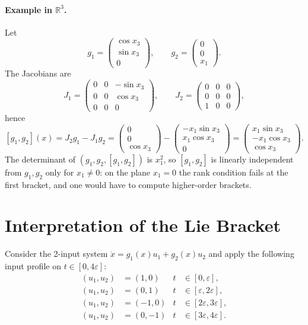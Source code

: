 \paragraph{Example in \( \mathbb{R}^3 \).}
Let
\[
g_1 = \begin{pmatrix} \cos x_3 \\ \sin x_3 \\ 0 \end{pmatrix},
\qquad
g_2 = \begin{pmatrix} 0 \\ 0 \\ x_1 \end{pmatrix}.
\]
The Jacobians are
\[
J_1 =
\begin{pmatrix}
    0 & 0 & -\sin x_3 \\
    0 & 0 & \cos x_3 \\
    0 & 0 & 0
\end{pmatrix},
\qquad
J_2 =
\begin{pmatrix}
    0 & 0 & 0 \\
    0 & 0 & 0 \\
    1 & 0 & 0
\end{pmatrix},
\]
hence
\[
[g_1, g_2](x) = J_2 g_1 - J_1 g_2 =
\begin{pmatrix} 0 \\ 0 \\ \cos x_3 \end{pmatrix}
- \begin{pmatrix} -x_1\sin x_3 \\ x_1\cos x_3 \\ 0 \end{pmatrix}
=
\begin{pmatrix}
    x_1 \sin x_3 \\
    -x_1 \cos x_3 \\
    \cos x_3
\end{pmatrix}.
\]
The determinant of \( (g_1, g_2, [g_1,g_2]) \) is \( x_1^2 \), so
\( [g_1, g_2] \) is linearly independent from \( g_1, g_2 \) only for
\( x_1 \neq 0 \): on the plane \( x_1 = 0 \) the rank condition fails
at the first bracket, and one would have to compute higher-order
brackets.

\section{Interpretation of the Lie Bracket}
\label{sec:lie-bracket-interpretation}

Consider the 2-input system \( \dot{x} = g_1(x) u_1 + g_2(x) u_2 \)
and apply the following input profile on \( t \in [0, 4\varepsilon] \):
\begin{align}
    (u_1, u_2) &= (1, 0) & t &\in [0, \varepsilon], \\
    (u_1, u_2) &= (0, 1) & t &\in [\varepsilon, 2\varepsilon], \\
    (u_1, u_2) &= (-1, 0) & t &\in [2\varepsilon, 3\varepsilon], \\
    (u_1, u_2) &= (0, -1) & t &\in [3\varepsilon, 4\varepsilon].
\end{align}


